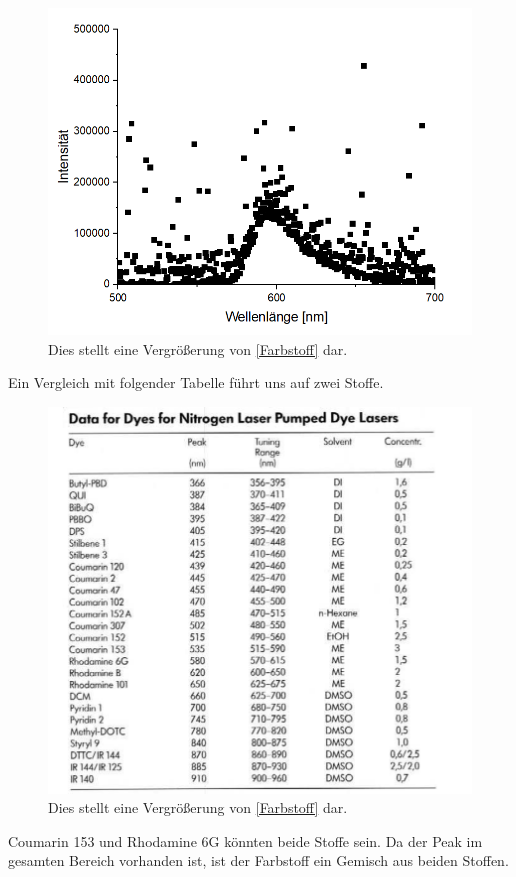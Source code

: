 \documentclass[
	a4paper,
	12pt,
	pagesize,
	ngerman
]{scrartcl}
\begin{document}
\begin{figure}[h!]
	\centering
	\includegraphics[scale = 1]{cool.png}
	\caption{Dies stellt eine Vergrößerung von \cref{Farbstoff} dar.}
	\label{cool}
\end{figure}
Ein Vergleich mit folgender Tabelle führt uns auf zwei Stoffe.
\begin{figure}[h!]
	\centering
	\includegraphics[scale = 1]{data.png}
	\caption{Dies stellt eine Vergrößerung von \cref{Farbstoff} dar.}
	\label{cool}
\end{figure}
Coumarin 153 und Rhodamine 6G könnten beide Stoffe sein. Da der Peak im gesamten Bereich vorhanden ist, ist der Farbstoff ein Gemisch aus beiden Stoffen.
\end{document}
